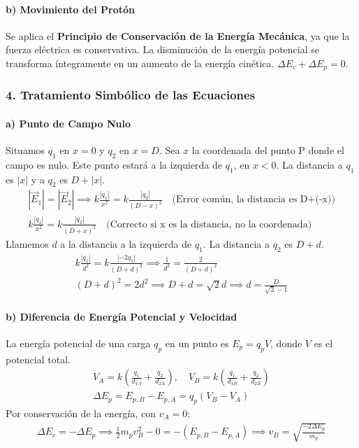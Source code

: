\paragraph*{b) Movimiento del Protón}
Se aplica el \textbf{Principio de Conservación de la Energía Mecánica}, ya que la fuerza eléctrica es conservativa. La disminución de la energía potencial se transforma íntegramente en un aumento de la energía cinética. $\Delta E_c + \Delta E_p = 0$.

\subsubsection*{4. Tratamiento Simbólico de las Ecuaciones}
\paragraph*{a) Punto de Campo Nulo}
Situamos $q_1$ en $x=0$ y $q_2$ en $x=D$. Sea $x$ la coordenada del punto P donde el campo es nulo. Este punto estará a la izquierda de $q_1$, en $x<0$. La distancia a $q_1$ es $|x|$ y a $q_2$ es $D+|x|$.
\begin{gather}
    |\vec{E}_1| = |\vec{E}_2| \implies k \frac{|q_1|}{x^2} = k \frac{|q_2|}{(D-x)^2} \quad \text{(Error común, la distancia es D+(-x))}
     \nonumber \\[8pt] k \frac{|q_1|}{x^2} = k \frac{|q_2|}{(D+x)^2} \quad \text{(Correcto si x es la distancia, no la coordenada)}
\end{gather}
Llamemos $d$ a la distancia a la izquierda de $q_1$. La distancia a $q_2$ es $D+d$.
\begin{gather}
    k \frac{|q_1|}{d^2} = k \frac{|-2q_1|}{(D+d)^2} \implies \frac{1}{d^2} = \frac{2}{(D+d)^2} \nonumber \\[8pt]
    (D+d)^2 = 2d^2 \implies D+d = \sqrt{2} d \implies d = \frac{D}{\sqrt{2}-1}
\end{gather}
\paragraph*{b) Diferencia de Energía Potencial y Velocidad}
La energía potencial de una carga $q_p$ en un punto es $E_p = q_p V$, donde $V$ es el potencial total.
\begin{gather}
    V_A = k\left(\frac{q_1}{d_{1A}} + \frac{q_2}{d_{2A}}\right), \quad V_B = k\left(\frac{q_1}{d_{1B}} + \frac{q_2}{d_{2B}}\right) \nonumber \\[8pt]
    \Delta E_p = E_{p,B} - E_{p,A} = q_p (V_B - V_A)
\end{gather}
Por conservación de la energía, con $v_A=0$:
\begin{gather}
    \Delta E_c = -\Delta E_p \implies \frac{1}{2}m_p v_B^2 - 0 = -(E_{p,B} - E_{p,A}) \implies v_B = \sqrt{\frac{-2 \Delta E_p}{m_p}}
\end{gather}

